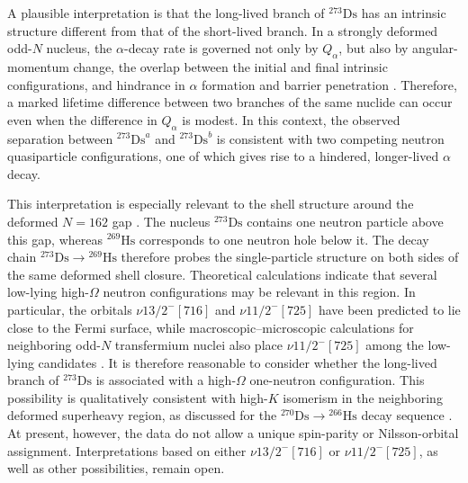 \documentclass[aps,prc,reprint,superscriptaddress,floatfix]{revtex4-2}
\begin{document}
A plausible interpretation is that the long-lived branch of $^{273}\mathrm{Ds}$ has an intrinsic structure different from that of the short-lived branch. In a strongly deformed odd-$N$ nucleus, the $\alpha$-decay rate is governed not only by $Q_{\alpha}$, but also by angular-momentum change, the overlap between the initial and final intrinsic configurations, and hindrance in $\alpha$ formation and barrier penetration \cite{clark2023RoleQuasiparticleStructure}. Therefore, a marked lifetime difference between two branches of the same nuclide can occur even when the difference in $Q_{\alpha}$ is modest. In this context, the observed separation between $^{273}\mathrm{Ds}^{a}$ and $^{273}\mathrm{Ds}^{b}$ is consistent with two competing neutron quasiparticle configurations, one of which gives rise to a hindered, longer-lived $\alpha$ decay.

This interpretation is especially relevant to the shell structure around the deformed $N = 162$ gap \cite{guoStabilizationDeformedSuperheavy2024}. The nucleus $^{273}\mathrm{Ds}$ contains one neutron particle above this gap, whereas $^{269}\mathrm{Hs}$ corresponds to one neutron hole below it. The decay chain $^{273}\mathrm{Ds} \rightarrow {}^{269}\mathrm{Hs}$ therefore probes the single-particle structure on both sides of the same deformed shell closure. Theoretical calculations indicate that several low-lying high-$\Omega$ neutron configurations may be relevant in this region. In particular, the orbitals $\nu 13/2^{-}[716]$ and $\nu 11/2^{-}[725]$ have been predicted to lie close to the Fermi surface, while macroscopic--microscopic calculations for neighboring odd-$N$ transfermium nuclei also place $\nu 11/2^{-}[725]$ among the low-lying candidates \cite{Shi2014,Parkhomenko2005}. It is therefore reasonable to consider whether the long-lived branch of $^{273}\mathrm{Ds}$ is associated with a high-$\Omega$ one-neutron configuration. This possibility is qualitatively consistent with high-$K$ isomerism in the neighboring deformed superheavy region, as discussed for the $^{270}\mathrm{Ds} \rightarrow {}^{266}\mathrm{Hs}$ decay sequence \cite{xuEnhancedStabilitySuperheavy2004}. At present, however, the data do not allow a unique spin-parity or Nilsson-orbital assignment. Interpretations based on either $\nu 13/2^{-}[716]$ or $\nu 11/2^{-}[725]$, as well as other possibilities, remain open.
\end{document}
